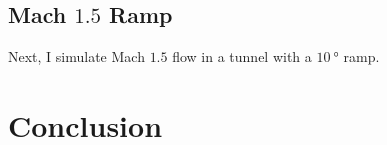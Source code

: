 \documentclass[paper=a4, fontsize=11pt]{scrartcl}
\numberwithin{equation}{section}        %
\numberwithin{figure}{section}          %
\numberwithin{table}{section}               %
\begin{document}
\subsection{Mach $1.5$ Ramp}
Next, I simulate Mach $1.5$ flow in a tunnel with a $\SI{10}{\degree}$ ramp.
\section{Conclusion}
\end{document}
